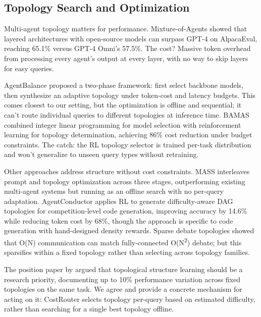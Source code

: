 \subsection{Topology Search and Optimization}\label{topology-search-and-optimization}

Multi-agent topology matters for performance. Mixture-of-Agents \cite{wang_2024_moa} showed that layered architectures with open-source models can surpass GPT-4 on AlpacaEval, reaching 65.1\% versus GPT-4 Omni's 57.5\%. The cost? Massive token overhead from processing every agent's output at every layer, with no way to skip layers for easy queries.

AgentBalance \cite{zhang_2025_agentbalance} proposed a two-phase framework: first select backbone models, then synthesize an adaptive topology under token-cost and latency budgets. This comes closest to our setting, but the optimization is offline and sequential; it can't route individual queries to different topologies at inference time. BAMAS \cite{zhuo_2025} combined integer linear programming for model selection with reinforcement learning for topology determination, achieving 86\% cost reduction under budget constraints. The catch: the RL topology selector is trained per-task distribution and won't generalize to unseen query types without retraining.

Other approaches address structure without cost constraints. MASS \cite{google_2025_mass} interleaves prompt and topology optimization across three stages, outperforming existing multi-agent systems but running as an offline search with no per-query adaptation. AgentConductor \cite{agentconductor_2025} applies RL to generate difficulty-aware DAG topologies for competition-level code generation, improving accuracy by 14.6\% while reducing token cost by 68\%, though the approach is specific to code generation with hand-designed density rewards. Sparse debate topologies \cite{sparse_debate_2024} showed that O(N) communication can match fully-connected O(N\textsuperscript{2}) debate; but this sparsifies within a fixed topology rather than selecting across topology families.

The position paper by \cite{topo_priority_2025} argued that topological structure learning should be a research priority, documenting up to 10\% performance variation across fixed topologies on the same task. We agree and provide a concrete mechanism for acting on it: CostRouter selects topology per-query based on estimated difficulty, rather than searching for a single best topology offline.

